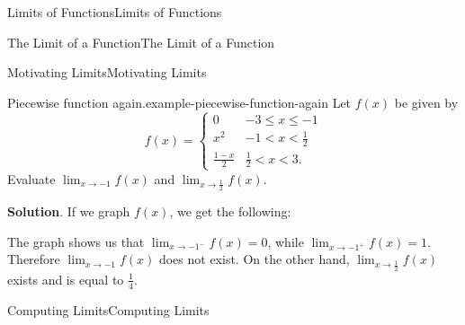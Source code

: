 \documentclass[10pt,]{book}
\numberwithin{equation}{section}
\begin{document}
\begin{chapterptx}{Limits of Functions}{}{Limits of Functions}{}{}
\begin{sectionptx}{The Limit of a Function}{}{The Limit of a Function}{}{}
\begin{subsectionptx}{Motivating Limits}{}{Motivating Limits}{}{}
\begin{example}{Piecewise function again.}{example-piecewise-function-again}
\hypertarget{p-16}{}%
Let \(f(x)\) be given by%
\begin{equation*}
f(x) = \begin{cases} 0 & -3\leq x \leq -1 \\ x^{2} & -1 < x < \frac{1}{2} \\ \frac{1-x}{2} & \frac{1}{2} < x < 3. \end{cases} 
\end{equation*}
Evaluate \(\lim_{x\to-1}f(x)\) and \(\lim_{x\to\frac{1}{2}}f(x)\).%
\par\smallskip%
\noindent\textbf{Solution}.\hypertarget{solution-3}{}\quad%
\hypertarget{p-17}{}%
If we graph \(f(x)\), we get the following:%
\begin{figure}
\centering
{
}
\end{figure}
\hypertarget{p-18}{}%
The graph shows us that \(\lim_{x\to-1^{-}}f(x) = 0\), while \(\lim_{x\to-1^{+}}f(x) = 1\). Therefore \(\lim_{x\to-1}f(x)\) does not exist. On the other hand, \(\lim_{x\to\frac{1}{2}}f(x)\) exists and is equal to \(\frac{1}{4}\).%
\end{example}
\end{subsectionptx}
\end{sectionptx}
%
%
\typeout{************************************************}
\typeout{************************************************}
%
\begin{sectionptx}{Computing Limits}{}{Computing Limits}{}{}\label{section-computing-limits}

\end{sectionptx}
\end{chapterptx}
\end{document}
